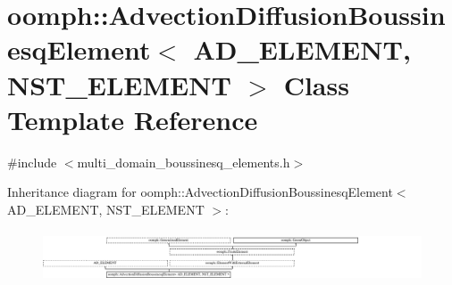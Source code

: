 \hypertarget{classoomph_1_1AdvectionDiffusionBoussinesqElement}{}\section{oomph\+:\+:Advection\+Diffusion\+Boussinesq\+Element$<$ A\+D\+\_\+\+E\+L\+E\+M\+E\+NT, N\+S\+T\+\_\+\+E\+L\+E\+M\+E\+NT $>$ Class Template Reference}
\label{classoomph_1_1AdvectionDiffusionBoussinesqElement}


{\ttfamily \#include $<$multi\+\_\+domain\+\_\+boussinesq\+\_\+elements.\+h$>$}

Inheritance diagram for oomph\+:\+:Advection\+Diffusion\+Boussinesq\+Element$<$ A\+D\+\_\+\+E\+L\+E\+M\+E\+NT, N\+S\+T\+\_\+\+E\+L\+E\+M\+E\+NT $>$\+:\begin{figure}[H]
\begin{center}
\leavevmode
\includegraphics[height=1.549101cm]{classoomph_1_1AdvectionDiffusionBoussinesqElement}
\end{center}
\end{figure}
